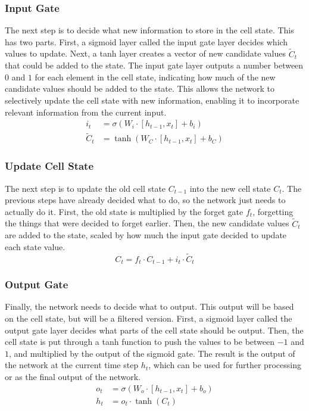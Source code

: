 \documentclass{article}
\begin{document}
\subsubsection{Input Gate}
\label{sec:3.0.1}

The next step is to decide what new information to store in the cell state. This has two
parts. First, a sigmoid layer called the input gate layer decides which values to update.
Next, a tanh layer creates a vector of new candidate values $\tilde{C}_t$ that could be
added to the state. The input gate layer outputs a number between $0$ and $1$ for each
element in the cell state, indicating how much of the new candidate values should be added
to the state. This allows the network to selectively update the cell state with new
information, enabling it to incorporate relevant information from the current input.
\begin{align}
  i_t         & = \sigma(W_i \cdot [h_{t-1}, x_t] + b_i) \\
  \tilde{C}_t & = \tanh(W_C \cdot [h_{t-1}, x_t] + b_C)
\end{align}


\subsubsection{Update Cell State}
\label{sec:3.0.2}

The next step is to update the old cell state $C_{t-1}$ into the new cell state $C_t$. The
previous steps have already decided what to do, so the network just needs to actually do
it. First, the old state is multiplied by the forget gate $f_t$, forgetting the things
that were decided to forget earlier. Then, the new candidate values $\tilde{C}_t$ are added
to the state, scaled by how much the input gate decided to update each state value.
\begin{equation}
  C_t = f_t \cdot C_{t-1} + i_t \cdot \tilde{C}_t
\end{equation}


\subsubsection{Output Gate}
\label{sec:3.0.3}

Finally, the network needs to decide what to output. This output will be based on the cell
state, but will be a filtered version. First, a sigmoid layer called the output gate layer
decides what parts of the cell state should be output. Then, the cell state is put through
a tanh function to push the values to be between $-1$ and $1$, and multiplied by the
output of the sigmoid gate. The result is the output of the network at the current time
step $h_t$, which can be used for further processing or as the final output of the
network.
\begin{align}
  o_t & = \sigma(W_o \cdot [h_{t-1}, x_t] + b_o) \\
  h_t & = o_t \cdot \tanh(C_t)
\end{align}
\end{document}
